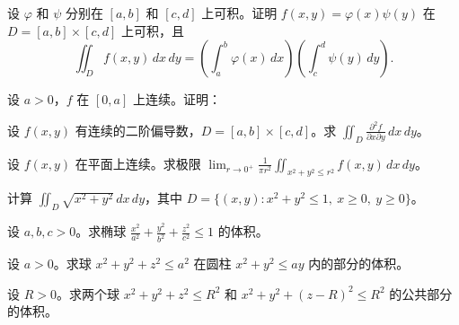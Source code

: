 \noindent\begin{minipage}{\textwidth}
设 $\varphi$ 和 $\psi$ 分别在 $[a,b]$ 和 $[c,d]$ 上可积。证明 $f(x,y)=\varphi(x)\psi(y)$ 在 $D=[a,b]\times[c,d]$ 上可积，且\[\iint_D f(x,y)\,dx\,dy=\left(\int_a^b\varphi(x)\,dx\right)\left(\int_c^d\psi(y)\,dy\right).\]
\end{minipage}\par\vfill
\noindent\begin{minipage}{\textwidth}
设 $a>0$，$f$ 在 $[0,a]$ 上连续。证明：
\end{minipage}\par\vfill
\newpage
\noindent\begin{minipage}{\textwidth}
设 $f(x,y)$ 有连续的二阶偏导数，$D=[a,b]\times[c,d]$。求 $\displaystyle\iint_D\frac{\partial^2f}{\partial x\partial y}\,dx\,dy$。
\end{minipage}\par\vfill
\noindent\begin{minipage}{\textwidth}
设 $f(x,y)$ 在平面上连续。求极限 $\displaystyle\lim_{r\to0^+}\frac1{\pi r^2}\iint_{x^2+y^2\le r^2}f(x,y)\,dx\,dy$。
\end{minipage}\par\vfill
\noindent\begin{minipage}{\textwidth}
计算 $\displaystyle\iint_D\sqrt{x^2+y^2}\,dx\,dy$，其中 $D=\{(x,y):x^2+y^2\le1,\ x\ge0,\ y\ge0\}$。
\end{minipage}\par\vfill
\noindent\begin{minipage}{\textwidth}
设 $a,b,c>0$。求椭球 $\displaystyle\frac{x^2}{a^2}+\frac{y^2}{b^2}+\frac{z^2}{c^2}\le1$ 的体积。
\end{minipage}\par\vfill
\newpage
\noindent\begin{minipage}{\textwidth}
设 $a>0$。求球 $x^2+y^2+z^2\le a^2$ 在圆柱 $x^2+y^2\le ay$ 内的部分的体积。
\end{minipage}\par\vfill
\noindent\begin{minipage}{\textwidth}
设 $R>0$。求两个球 $x^2+y^2+z^2\le R^2$ 和 $x^2+y^2+(z-R)^2\le R^2$ 的公共部分的体积。
\end{minipage}\par\vfill
